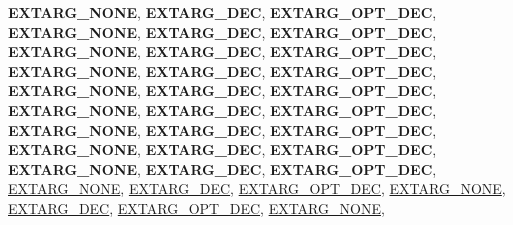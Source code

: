 \begin{DoxyCompactItemize}
{\bfseries E\+X\+T\+A\+R\+G\+\_\+\+N\+O\+NE}, 
{\bfseries E\+X\+T\+A\+R\+G\+\_\+\+D\+EC}, 
{\bfseries E\+X\+T\+A\+R\+G\+\_\+\+O\+P\+T\+\_\+\+D\+EC}, 
{\bfseries E\+X\+T\+A\+R\+G\+\_\+\+N\+O\+NE}, 
\newline
{\bfseries E\+X\+T\+A\+R\+G\+\_\+\+D\+EC}, 
{\bfseries E\+X\+T\+A\+R\+G\+\_\+\+O\+P\+T\+\_\+\+D\+EC}, 
{\bfseries E\+X\+T\+A\+R\+G\+\_\+\+N\+O\+NE}, 
{\bfseries E\+X\+T\+A\+R\+G\+\_\+\+D\+EC}, 
\newline
{\bfseries E\+X\+T\+A\+R\+G\+\_\+\+O\+P\+T\+\_\+\+D\+EC}, 
{\bfseries E\+X\+T\+A\+R\+G\+\_\+\+N\+O\+NE}, 
{\bfseries E\+X\+T\+A\+R\+G\+\_\+\+D\+EC}, 
{\bfseries E\+X\+T\+A\+R\+G\+\_\+\+O\+P\+T\+\_\+\+D\+EC}, 
\newline
{\bfseries E\+X\+T\+A\+R\+G\+\_\+\+N\+O\+NE}, 
{\bfseries E\+X\+T\+A\+R\+G\+\_\+\+D\+EC}, 
{\bfseries E\+X\+T\+A\+R\+G\+\_\+\+O\+P\+T\+\_\+\+D\+EC}, 
{\bfseries E\+X\+T\+A\+R\+G\+\_\+\+N\+O\+NE}, 
\newline
{\bfseries E\+X\+T\+A\+R\+G\+\_\+\+D\+EC}, 
{\bfseries E\+X\+T\+A\+R\+G\+\_\+\+O\+P\+T\+\_\+\+D\+EC}, 
{\bfseries E\+X\+T\+A\+R\+G\+\_\+\+N\+O\+NE}, 
{\bfseries E\+X\+T\+A\+R\+G\+\_\+\+D\+EC}, 
\newline
{\bfseries E\+X\+T\+A\+R\+G\+\_\+\+O\+P\+T\+\_\+\+D\+EC}, 
{\bfseries E\+X\+T\+A\+R\+G\+\_\+\+N\+O\+NE}, 
{\bfseries E\+X\+T\+A\+R\+G\+\_\+\+D\+EC}, 
{\bfseries E\+X\+T\+A\+R\+G\+\_\+\+O\+P\+T\+\_\+\+D\+EC}, 
\newline
{\bfseries E\+X\+T\+A\+R\+G\+\_\+\+N\+O\+NE}, 
{\bfseries E\+X\+T\+A\+R\+G\+\_\+\+D\+EC}, 
{\bfseries E\+X\+T\+A\+R\+G\+\_\+\+O\+P\+T\+\_\+\+D\+EC}, 
\hyperlink{group__extensions_ggacc9f55936dc165257a2e1f7d47bce89eaabcf56c456c1ff6e81dc82586a16f14c}{E\+X\+T\+A\+R\+G\+\_\+\+N\+O\+NE}, 
\newline
\hyperlink{group__extensions_ggacc9f55936dc165257a2e1f7d47bce89ea1c86adf924c8786a12bee9687094673e}{E\+X\+T\+A\+R\+G\+\_\+\+D\+EC}, 
\hyperlink{group__extensions_ggacc9f55936dc165257a2e1f7d47bce89ea5265abe3e1c3f64412f2affe7bffd880}{E\+X\+T\+A\+R\+G\+\_\+\+O\+P\+T\+\_\+\+D\+EC}, 
\hyperlink{group__extensions_ggacc9f55936dc165257a2e1f7d47bce89eaabcf56c456c1ff6e81dc82586a16f14c}{E\+X\+T\+A\+R\+G\+\_\+\+N\+O\+NE}, 
\hyperlink{group__extensions_ggacc9f55936dc165257a2e1f7d47bce89ea1c86adf924c8786a12bee9687094673e}{E\+X\+T\+A\+R\+G\+\_\+\+D\+EC}, 
\newline
\hyperlink{group__extensions_ggacc9f55936dc165257a2e1f7d47bce89ea5265abe3e1c3f64412f2affe7bffd880}{E\+X\+T\+A\+R\+G\+\_\+\+O\+P\+T\+\_\+\+D\+EC}, 
\hyperlink{group__extensions_ggacc9f55936dc165257a2e1f7d47bce89eaabcf56c456c1ff6e81dc82586a16f14c}{E\+X\+T\+A\+R\+G\+\_\+\+N\+O\+NE}, 

\end{DoxyCompactItemize}
